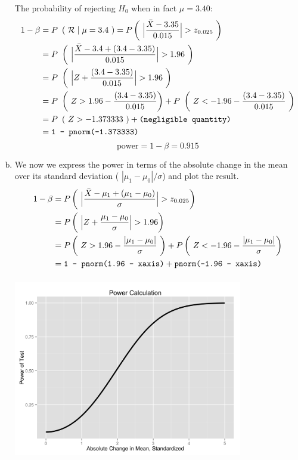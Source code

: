 \documentclass[12pt]{article}
\begin{document}
\begin{enumerate}[(a)]
The probability of rejecting $H_0$ when in fact $\mu = 3.40$:
\begin{align*}
1 - \beta &= P\ \left( \ \mathcal{R} \mid \mu = 3.4 \ \right) = P \left( \ \Big| \frac{\bar X - 3.35}{0.015} \Big| > z_{0.025} \ \right)\\
&= P \ \left( \ \Big| \frac{\bar X - 3.4 + (3.4 - 3.35)}{0.015} \Big| > 1.96 \ \right) \\
&= P \ \left( \ \Big| Z +\frac{(3.4 - 3.35)}{0.015} \Big| > 1.96 \ \right) \\
&= P \ \left( \ Z > 1.96 - \frac{(3.4 - 3.35)}{0.015} \right) + P \ \left( \ Z < -1.96 - \frac{(3.4 - 3.35)}{0.015} \ \right) \\
&= P \ \left( \ Z > -1.373333 \ \right) + \text{\texttt{(negligible quantity)}} \\
&= \text{\texttt{1 - pnorm(-1.373333)}}
\end{align*}
$$
\boxed{\text{power}  = 1 - \beta  = 0.915}
$$

\item We now we express the power in terms of the absolute change in the mean over its standard deviation ( $ | \mu_1 - \mu_0 | / \sigma$) and plot the result.
\begin{align*}
1 - \beta &= P \left( \ \Big| \frac{\bar X - \mu_1 + (\mu_1 - \mu_0)}{\sigma} \Big| > z_{0.025} \right) \\
&= P \left( \ \Big|  Z +  \frac{\mu_1 - \mu_0} {\sigma}  \Big| >  1.96 \right) \\
&= P \left( \ Z > 1.96 -  \frac{ | \mu_1 - \mu_0 | } {\sigma}  \ \right)  + P \left( \ Z < -1.96 -  \frac{ | \mu_1 - \mu_0 | } {\sigma}  \right)  \\
&= \text{\texttt{1 - pnorm(1.96 - xaxis)}} + \text{\texttt{pnorm(-1.96 - xaxis)}} \\
\end{align*}

\begin{center}
\includegraphics[width=10cm, height=8cm, width= 10cm]{power_plot_2c}
\end{center} 


\end{enumerate}
\end{document}
